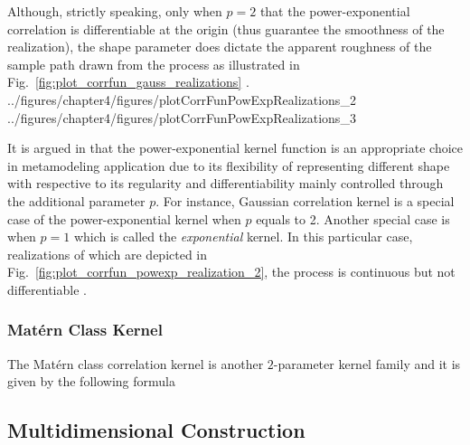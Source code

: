Although, strictly speaking, only when $p = 2$ that the power-exponential correlation is differentiable at the origin (thus guarantee the smoothness of the realization),
the shape parameter does dictate the apparent roughness of the sample path drawn from the process as illustrated in Fig.~\ref{fig:plot_corrfun_gauss_realizations} \cite{Rasmussen2006}.
{../figures/chapter4/figures/plotCorrFunPowExpRealizations_2}
{../figures/chapter4/figures/plotCorrFunPowExpRealizations_3}

It is argued in \cite{Marrel2008} that the power-exponential kernel function is an appropriate choice in metamodeling application due to its flexibility of representing different shape with respective to its regularity and differentiability mainly controlled through the additional parameter $p$.
For instance, Gaussian correlation kernel is a special case of the power-exponential kernel when $p$ equals to 2. 
Another special case is when $p = 1$ which is called the \emph{exponential} kernel.
In this particular case, realizations of which are depicted in Fig.~\ref{fig:plot_corrfun_powexp_realization_2}, the process is continuous but not differentiable \cite{Rasmussen2006}.

\subsubsection{Mat\'ern Class Kernel}

The Mat\'ern class correlation kernel is another $2$-parameter kernel family and it is given by the following formula
\lipsum[2]

\subsection{Multidimensional Construction}

